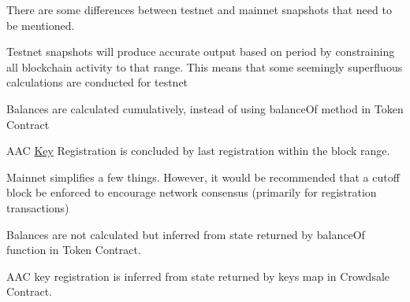 There are some differences between testnet and mainnet snapshots that need to be mentioned.


\begin{DoxyItemize}
\item Testnet snapshots will produce accurate output based on period by constraining all blockchain activity to that range. This means that some seemingly superfluous calculations are conducted for testnet
\begin{DoxyItemize}
\item Balances are calculated cumulatively, instead of using {\ttfamily balance\+Of} method in Token Contract
\item A\+AC \mbox{\hyperlink{struct_key}{Key}} Registration is concluded by last registration within the block range.
\end{DoxyItemize}
\item Mainnet simplifies a few things. However, it would be recommended that a cutoff block be enforced to encourage network consensus (primarily for registration transactions)
\begin{DoxyItemize}
\item Balances are not calculated but inferred from state returned by {\ttfamily balance\+Of} function in Token Contract.
\item A\+AC key registration is inferred from state returned by {\ttfamily keys} map in Crowdsale Contract. 
\end{DoxyItemize}
\end{DoxyItemize}